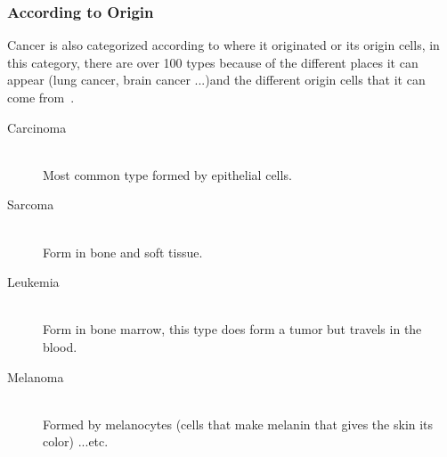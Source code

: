             \subsubsection{According to Origin}
            Cancer is also categorized according to where it originated or its origin cells, in this category, there are over 100 types because of the different places it can appear (lung cancer, brain cancer ...)and the different origin cells that it can come from~\cite{whatiscancer2021}.
            \begin{description}
                \item[Carcinoma] \hfill \\
                Most common type formed by epithelial cells.
                \item[Sarcoma] \hfill \\
                Form in bone and soft tissue.
                \item[Leukemia] \hfill \\
                Form in bone marrow, this type does form a tumor but travels in the blood.
                \item[Melanoma] \hfill \\
                Formed by melanocytes (cells that make melanin that gives the skin its color)
                ...etc.
            \end{description}
